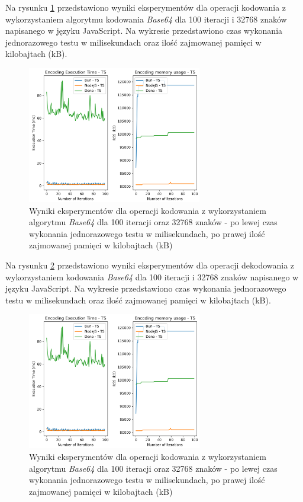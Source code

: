 Na rysunku \ref{fig:encoding_e1_ts} przedstawiono wyniki eksperymentów dla operacji kodowania z wykorzystaniem algorytmu kodowania \textit{Base64} dla 100 iteracji i 32768 znaków napisanego w języku JavaScript. Na wykresie przedstawiono czas wykonania jednorazowego testu w milisekundach oraz ilość zajmowanej pamięci w kilobajtach (kB).

\begin{figure}[H]
  \centering
  \includegraphics[width=0.68\textwidth]{Figures/coding/base64_100_encoding_ts.png}
  \caption{Wyniki eksperymentów dla operacji kodowania z wykorzystaniem algorytmu \textit{Base64} dla 100 iteracji oraz 32768 znaków - po lewej czas wykonania jednorazowego testu w milisekundach, po prawej ilość zajmowanej pamięci w kilobajtach (kB)}
  \label{fig:encoding_e1_ts}
\end{figure}

Na rysunku \ref{fig:decoding_e1_ts} przedstawiono wyniki eksperymentów dla operacji dekodowania z wykorzystaniem kodowania \textit{Base64} dla 100 iteracji i 32768 znaków napisanego w języku JavaScript. Na wykresie przedstawiono czas wykonania jednorazowego testu w milisekundach oraz ilość zajmowanej pamięci w kilobajtach (kB).

\begin{figure}[H]
  \centering
  \includegraphics[width=0.68\textwidth]{Figures/coding/base64_100_encoding_ts.png}
  \caption{Wyniki eksperymentów dla operacji kodowania z wykorzystaniem algorytmu \textit{Base64} dla 100 iteracji oraz 32768 znaków - po lewej czas wykonania jednorazowego testu w milisekundach, po prawej ilość zajmowanej pamięci w kilobajtach (kB)}
  \label{fig:decoding_e1_ts}
\end{figure}


